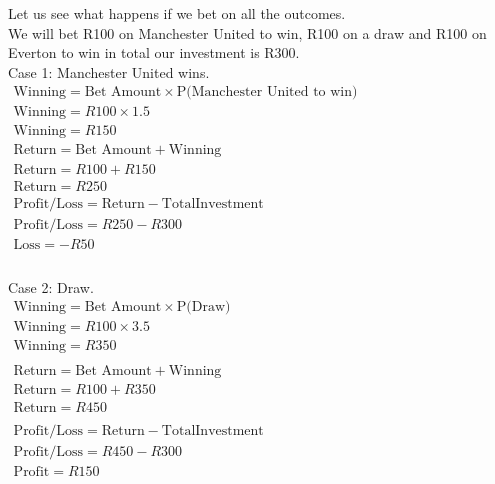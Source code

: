 Let us see what happens if we bet on all the outcomes. \\
We will bet R100 on Manchester United to win, R100 on a draw and R100 on Everton to win in total our investment is R300. \\

Case 1: Manchester United wins. \\

\begin{math}
\begin{array}{l}
\text{Winning} = \text{Bet Amount} \times \text{P(Manchester United to win)} \\
\text{Winning} = R100 \times 1.5 \\
\text{Winning} = R150 \\

\text{Return} = \text{Bet Amount} + \text{Winning} \\
\text{Return} = R100 + R150 \\
\text{Return} = R250 \\

\text{Profit/Loss} = \text{Return} - \text{TotalInvestment} \\
\text{Profit/Loss} = R250 - R300 \\
\text{Loss} = -R50 \\
\\
\end{array}
\end{math}

Case 2: Draw. \\

\begin{math}
\begin{array}{l}
\text{Winning} = \text{Bet Amount} \times \text{P(Draw)} \\
\text{Winning} = R100 \times 3.5 \\
\text{Winning} = R350 \\
\\
\text{Return} = \text{Bet Amount} + \text{Winning} \\
\text{Return} = R100 + R350 \\
\text{Return} = R450 \\
\\
\text{Profit/Loss} = \text{Return} - \text{TotalInvestment} \\
\text{Profit/Loss} = R450 - R300 \\
\text{Profit} = R150 \\
\\
\end{array}
\end{math}

